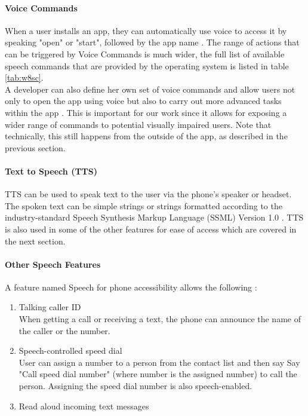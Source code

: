 \paragraph{Voice Commands}
When a user installs an app, they can automatically use voice to access it by speaking "open" or "start", followed by the app name \cite{wp8voice}. The range of actions that can be triggered by Voice Commands is much wider, the full list of available speech commands that are provided by the operating system is listed in table \ref{tab:w8sc}.\\
A developer can also define her own set of voice commands and allow users not only to open the app using voice but also to carry out more advanced tasks within the app \cite{wp8voice}. This is important for our work since it allows for exposing a wider range of commands to potential visually impaired users. Note that technically, this still happens from the outside of the app, as described in the previous section.

\paragraph{Text to Speech (TTS)}
TTS can be used to speak text to the user via the phone's speaker or headset. The spoken text can be simple strings or strings formatted according to the industry-standard Speech Synthesis Markup Language (SSML) Version 1.0 \cite{phone8speech}. TTS is also used in some of the other features for ease of access which are covered in the next section.

\paragraph{Other Speech Features}
A feature named Speech for phone accessibility allows the following \cite{wp8voice}:
\begin{enumerate}
\item Talking caller ID\\
When getting a call or receiving a text, the phone can announce the name of the caller or the number.
\item Speech-controlled speed dial\\
User can assign a number to a person from the contact list and then say Say "Call speed dial number" (where number is the assigned number) to call the person. Assigning the speed dial number is also speech-enabled.
\item Read aloud incoming text messages
\end{enumerate}

